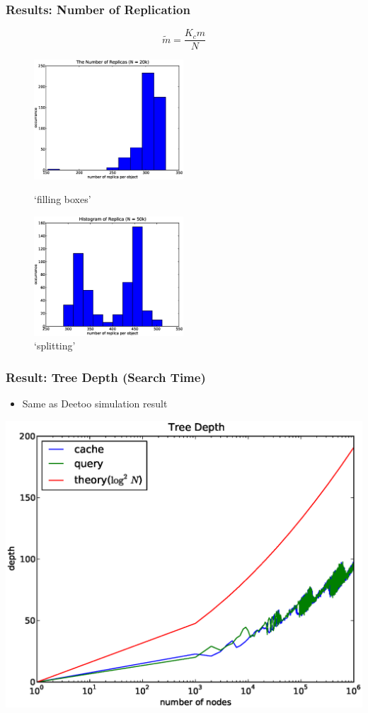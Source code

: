 \documentclass[red]{beamer}
\begin{document}
\begin{frame}
\frametitle{Results: Number of Replication}
\begin{equation}
\tilde m = \frac{K_c m}{N}
\end{equation}
\begin{figure}
\begin{minipage}{5cm}
\centering
\includegraphics[width=2.2in]{figs/rep_obj_20k.eps}
\caption{`filling boxes'} 
\end{minipage}
\begin{minipage}{5cm}
\centering
\includegraphics[width=2.2in]{figs/rep_obj_50k.eps}
\caption{`splitting'}
\end{minipage}
\end{figure}
\end{frame}


\begin{frame}
\frametitle{Result: Tree Depth (Search Time)}
\begin{itemize}
\item Same as Deetoo simulation result
\end{itemize}
\begin{center}
\includegraphics[scale=0.3]{figs/depth.eps}
\end{center}
\end{frame}
\end{document}

